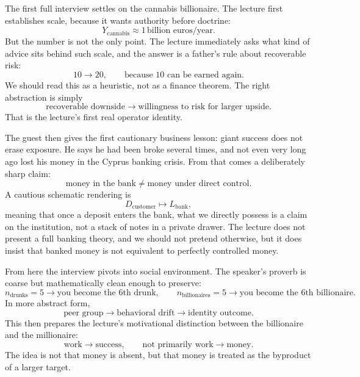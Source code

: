 The first full interview settles on the cannabis billionaire. The lecture first establishes scale, because it wants authority before doctrine:
\begin{equation}
Y_{\text{cannabis}} \approx 1\,\text{billion euros/year}.
\end{equation}
But the number is not the only point. The lecture immediately asks what kind of advice sits behind such scale, and the answer is a father's rule about recoverable risk:
\begin{equation}
10 \to 20,
\qquad
\text{because }10\text{ can be earned again.}
\end{equation}
We should read this as a heuristic, not as a finance theorem. The right abstraction is simply
\begin{equation}
\text{recoverable downside} \to \text{willingness to risk for larger upside}.
\end{equation}
That is the lecture's first real operator identity.

The guest then gives the first cautionary business lesson: giant success does not erase exposure. He says he had been broke several times, and not even very long ago lost his money in the Cyprus banking crisis. From that comes a deliberately sharp claim:
\begin{equation}
\text{money in the bank} \neq \text{money under direct control}.
\end{equation}
A cautious schematic rendering is
\begin{equation}
D_{\text{customer}} \mapsto L_{\text{bank}},
\end{equation}
meaning that once a deposit enters the bank, what we directly possess is a claim on the institution, not a stack of notes in a private drawer. The lecture does not present a full banking theory, and we should not pretend otherwise, but it does insist that banked money is not equivalent to perfectly controlled money.

From here the interview pivots into social environment. The speaker's proverb is coarse but mathematically clean enough to preserve:
\begin{equation}
n_{\text{drunks}}=5 \to \text{you become the 6th drunk},
\qquad
n_{\text{billionaires}}=5 \to \text{you become the 6th billionaire}.
\end{equation}
In more abstract form,
\begin{equation}
\text{peer group} \to \text{behavioral drift} \to \text{identity outcome}.
\end{equation}
This then prepares the lecture's motivational distinction between the billionaire and the millionaire:
\begin{equation}
\text{work} \to \text{success},
\qquad
\text{not primarily } \text{work} \to \text{money}.
\end{equation}
The idea is not that money is absent, but that money is treated as the byproduct of a larger target.

